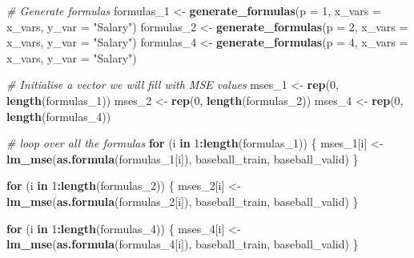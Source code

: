 \documentclass[12pt,]{article}
\newenvironment{Shaded}{\begin{snugshade}}{\end{snugshade}}
\newcommand{\CommentTok}[1]{\textcolor[rgb]{0.56,0.35,0.01}{\textit{#1}}}
\newcommand{\ControlFlowTok}[1]{\textcolor[rgb]{0.13,0.29,0.53}{\textbf{#1}}}
\newcommand{\DataTypeTok}[1]{\textcolor[rgb]{0.13,0.29,0.53}{#1}}
\newcommand{\DecValTok}[1]{\textcolor[rgb]{0.00,0.00,0.81}{#1}}
\newcommand{\KeywordTok}[1]{\textcolor[rgb]{0.13,0.29,0.53}{\textbf{#1}}}
\newcommand{\NormalTok}[1]{#1}
\newcommand{\OperatorTok}[1]{\textcolor[rgb]{0.81,0.36,0.00}{\textbf{#1}}}
\newcommand{\StringTok}[1]{\textcolor[rgb]{0.31,0.60,0.02}{#1}}
\begin{document}
\begin{Shaded}
\begin{Highlighting}[]
\CommentTok{# Generate formulas}
\NormalTok{formulas_}\DecValTok{1}\NormalTok{ <-}\StringTok{ }\KeywordTok{generate_formulas}\NormalTok{(}\DataTypeTok{p =} \DecValTok{1}\NormalTok{, }\DataTypeTok{x_vars =}\NormalTok{ x_vars, }\DataTypeTok{y_var =} \StringTok{"Salary"}\NormalTok{)}
\NormalTok{formulas_}\DecValTok{2}\NormalTok{ <-}\StringTok{ }\KeywordTok{generate_formulas}\NormalTok{(}\DataTypeTok{p =} \DecValTok{2}\NormalTok{, }\DataTypeTok{x_vars =}\NormalTok{ x_vars, }\DataTypeTok{y_var =} \StringTok{"Salary"}\NormalTok{)}
\NormalTok{formulas_}\DecValTok{4}\NormalTok{ <-}\StringTok{ }\KeywordTok{generate_formulas}\NormalTok{(}\DataTypeTok{p =} \DecValTok{4}\NormalTok{, }\DataTypeTok{x_vars =}\NormalTok{ x_vars, }\DataTypeTok{y_var =} \StringTok{"Salary"}\NormalTok{)}

\CommentTok{# Initialise a vector we will fill with MSE values}
\NormalTok{mses_}\DecValTok{1}\NormalTok{ <-}\StringTok{ }\KeywordTok{rep}\NormalTok{(}\DecValTok{0}\NormalTok{, }\KeywordTok{length}\NormalTok{(formulas_}\DecValTok{1}\NormalTok{))}
\NormalTok{mses_}\DecValTok{2}\NormalTok{ <-}\StringTok{ }\KeywordTok{rep}\NormalTok{(}\DecValTok{0}\NormalTok{, }\KeywordTok{length}\NormalTok{(formulas_}\DecValTok{2}\NormalTok{))}
\NormalTok{mses_}\DecValTok{4}\NormalTok{ <-}\StringTok{ }\KeywordTok{rep}\NormalTok{(}\DecValTok{0}\NormalTok{, }\KeywordTok{length}\NormalTok{(formulas_}\DecValTok{4}\NormalTok{))}

\CommentTok{# loop over all the formulas}
\ControlFlowTok{for}\NormalTok{ (i }\ControlFlowTok{in} \DecValTok{1}\OperatorTok{:}\KeywordTok{length}\NormalTok{(formulas_}\DecValTok{1}\NormalTok{)) \{}
\NormalTok{  mses_}\DecValTok{1}\NormalTok{[i] <-}\StringTok{ }\KeywordTok{lm_mse}\NormalTok{(}\KeywordTok{as.formula}\NormalTok{(formulas_}\DecValTok{1}\NormalTok{[i]), baseball_train, baseball_valid)}
\NormalTok{\}}

\ControlFlowTok{for}\NormalTok{ (i }\ControlFlowTok{in} \DecValTok{1}\OperatorTok{:}\KeywordTok{length}\NormalTok{(formulas_}\DecValTok{2}\NormalTok{)) \{}
\NormalTok{  mses_}\DecValTok{2}\NormalTok{[i] <-}\StringTok{ }\KeywordTok{lm_mse}\NormalTok{(}\KeywordTok{as.formula}\NormalTok{(formulas_}\DecValTok{2}\NormalTok{[i]), baseball_train, baseball_valid)}
\NormalTok{\}}

\ControlFlowTok{for}\NormalTok{ (i }\ControlFlowTok{in} \DecValTok{1}\OperatorTok{:}\KeywordTok{length}\NormalTok{(formulas_}\DecValTok{4}\NormalTok{)) \{}
\NormalTok{  mses_}\DecValTok{4}\NormalTok{[i] <-}\StringTok{ }\KeywordTok{lm_mse}\NormalTok{(}\KeywordTok{as.formula}\NormalTok{(formulas_}\DecValTok{4}\NormalTok{[i]), baseball_train, baseball_valid)}
\NormalTok{\}}


\end{Highlighting}
\end{Shaded}
\end{document}
